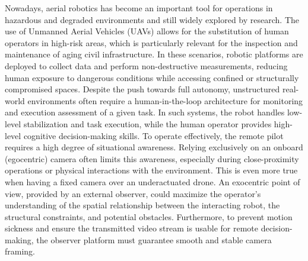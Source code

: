 Nowadays, aerial robotics has become an important tool for operations in hazardous and degraded environments and still widely explored by research. The use of Unmanned Aerial Vehicles (UAVs) allows for the substitution of human operators in high-risk areas, which is particularly relevant for the inspection and maintenance of aging civil infrastructure. In these scenarios, robotic platforms are deployed to collect data and perform non-destructive measurements, reducing human exposure to dangerous conditions while accessing confined or structurally compromised spaces.
Despite the push towards full autonomy, unstructured real-world environments often require a human-in-the-loop architecture for monitoring and execution assessment of a given task. In such systems, the robot handles low-level stabilization and task execution, while the human operator provides high-level cognitive decision-making skills. To operate effectively, the remote pilot requires a high degree of situational awareness. Relying exclusively on an onboard (egocentric) camera often limits this awareness, especially during close-proximity operations or physical interactions with the environment. This is even more true when having a fixed camera over an underactuated drone. An exocentric point of view, provided by an external observer, could maximize the operator's understanding of the spatial relationship between the interacting robot, the structural constraints, and potential obstacles. Furthermore, to prevent motion sickness and ensure the transmitted video stream is usable for remote decision-making, the observer platform must guarantee smooth and stable camera framing.
